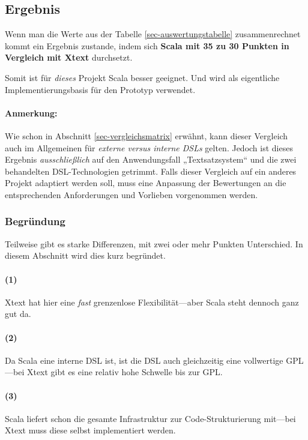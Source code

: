 \subsection{Ergebnis}

Wenn man die Werte aus der Tabelle \ref{sec-auswertungstabelle} zusammenrechnet
kommt ein Ergebnis zustande, indem sich \textbf{Scala mit 35 zu
30 Punkten in Vergleich mit Xtext} durchsetzt.

Somit ist für \emph{dieses} Projekt Scala besser geeignet.
Und wird als eigentliche Implementierungsbasis für den Prototyp verwendet.

\paragraph{Anmerkung:} Wie schon in Abschnitt \ref{sec-vergleichsmatrix}
erwähnt, kann dieser Vergleich auch im Allgemeinen für \emph{externe versus
interne DSLs} gelten. Jedoch ist dieses Ergebnis \emph{ausschließlich}
auf den Anwendungsfall „Textsatzsystem“ und die zwei
behandelten DSL-Technologien getrimmt. Falls dieser Vergleich
auf ein anderes Projekt adaptiert werden soll, muss eine Anpassung der
Bewertungen an die entsprechenden Anforderungen und Vorlieben vorgenommen werden.

\subsubsection{Begründung}

Teilweise gibt es starke Differenzen, mit zwei oder mehr Punkten Unterschied.
In diesem Abschnitt wird dies kurz begründet.

\paragraph{(1)} Xtext hat hier eine \emph{fast} grenzenlose
Flexibilität---aber Scala steht dennoch ganz gut da.

\paragraph{(2)} Da Scala eine interne DSL ist, ist die DSL auch gleichzeitig
eine vollwertige GPL---bei Xtext gibt es eine relativ hohe Schwelle bis zur GPL.

\paragraph{(3)} Scala liefert schon die gesamte Infrastruktur zur
Code-Strukturierung mit---bei Xtext muss diese selbst implementiert werden.

